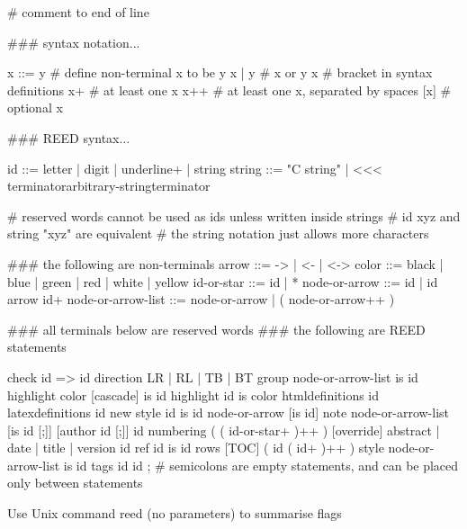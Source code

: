 # comment to end of line

### syntax notation...

x ::= y # define non-terminal x to be y
x | y # x or y
{x} # bracket in syntax definitions
x+ # at least one x
x++ # at least one x, separated by spaces
[x] # optional x

### REED syntax...

id ::= {letter | digit | underline}+ | string
string ::= "C string" | <<< terminator\n                            arbitrary-string\n                            terminator

# reserved words cannot be used as ids unless written inside strings
# id xyz and string "xyz" are equivalent
# the string notation just allows more characters

### the following are non-terminals
arrow ::= -> | <- | <->
color ::= black | blue | green | red | white | yellow
id-or-star ::= id | *
node-or-arrow ::= id | id {arrow id}+
node-or-arrow-list ::= node-or-arrow | ( node-or-arrow++ )

### all terminals below are reserved words
### the following are REED statements

check id => id
direction {LR | RL | TB | BT}
group node-or-arrow-list is id
highlight color [cascade] is id
highlight id is color
htmldefinitions id
latexdefinitions id
new style id is id
node-or-arrow [is id]
note node-or-arrow-list [is id [;]] [author id [;]] id
numbering ( {( id-or-star+ )}++ )
[override] {abstract | date | title | version} id
ref id is id
rows [TOC] ( {id ( id+ )}++ )
style node-or-arrow-list is id
tags id id
; # semicolons are empty statements, and can be placed only between statements

Use Unix command reed (no parameters) to summarise flags











